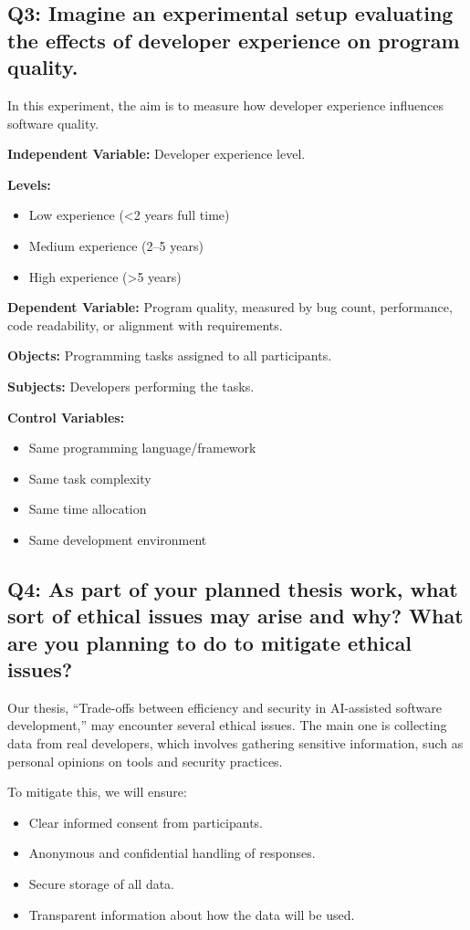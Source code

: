 \subsection*{Q3: Imagine an experimental setup evaluating the effects of developer experience on program quality.}

In this experiment, the aim is to measure how developer experience influences software quality.

\textbf{Independent Variable:} Developer experience level.

\textbf{Levels:}
\begin{itemize}
  \item Low experience (<2 years full time)
  \item Medium experience (2--5 years)
  \item High experience (>5 years)
\end{itemize}

\textbf{Dependent Variable:} Program quality, measured by bug count, performance, code readability, or alignment with requirements.

\textbf{Objects:} Programming tasks assigned to all participants.

\textbf{Subjects:} Developers performing the tasks.

\textbf{Control Variables:}
\begin{itemize}
  \item Same programming language/framework
  \item Same task complexity
  \item Same time allocation
  \item Same development environment
\end{itemize}

\subsection*{Q4: As part of your planned thesis work, what sort of ethical issues may arise and why? What are you planning to do to mitigate ethical issues?}

Our thesis, “Trade-offs between efficiency and security in AI-assisted software development,” may encounter several ethical issues. The main one is collecting data from real developers, which involves gathering sensitive information, such as personal opinions on tools and security practices.

To mitigate this, we will ensure:
\begin{itemize}
  \item Clear informed consent from participants.
  \item Anonymous and confidential handling of responses.
  \item Secure storage of all data.
  \item Transparent information about how the data will be used.
\end{itemize}

